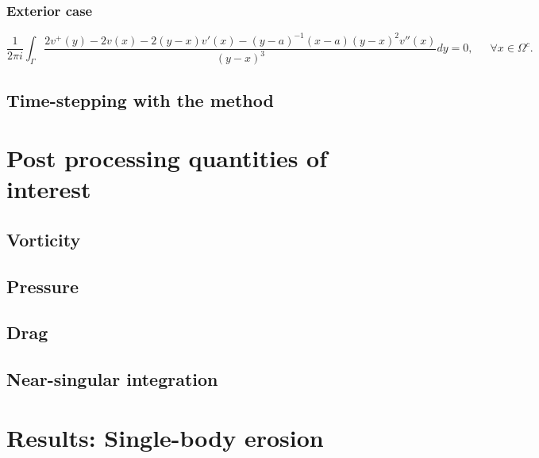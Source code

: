 \documentclass[preprint, 10pt]{elsarticle}
\begin{document}
\subsubsection{Exterior case}
\begin{equation}
\frac{1}{2\pi i}\int_{\Gamma}\frac{2v^+({ y})-2v(x)-2(y-x)v'(x)-(y-a)^{-1}(x-a)(y-x)^2v''(x)}{(y-x)^3} d{ y}=0,\,\,\,\,\,\,\,\,\, \forall { x} \in \Omega^c.
\end{equation}
\subsection{Time-stepping with the {\thL} method} 
\label{sec:timeStepping}


\section{Post processing quantities of interest}
\label{s:qoi}

\subsection{Vorticity}
\subsection{Pressure}
\label{sec:pressure}

\subsection{Drag}
\label{sec:drag}

\subsection{Near-singular integration}
\label{sec:NSI}

\section{Results: Single-body erosion}
\label{s:SingleResults}
\end{document}
